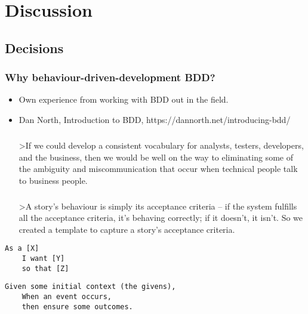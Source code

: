 \chapter{Discussion}

\section{Decisions}

\subsection{Why behaviour-driven-development BDD?}

\begin{itemize}
\item Own experience from working with BDD out in the field.

\item Dan North, Introduction to BDD, https://dannorth.net/introducing-bdd/

\paragraph{}
    >If we could develop a consistent vocabulary for analysts, testers, developers, and the business, then we would be well on the way to eliminating some of the ambiguity and miscommunication that occur when technical people talk to business people.
    
\paragraph{}
    >A story’s behaviour is simply its acceptance criteria – if the system fulfills all the acceptance criteria, it’s behaving correctly; if it doesn’t, it isn’t. So we created a template to capture a story’s acceptance criteria.
\end{itemize}

\begin{lstlisting}[language=text,caption={As a, I want, so what}]
    As a [X]
    I want [Y]
    so that [Z]
\end{lstlisting}

\begin{lstlisting}[language=text,caption={given, when, then}]
    Given some initial context (the givens),
    When an event occurs,
    then ensure some outcomes.
\end{lstlisting}




